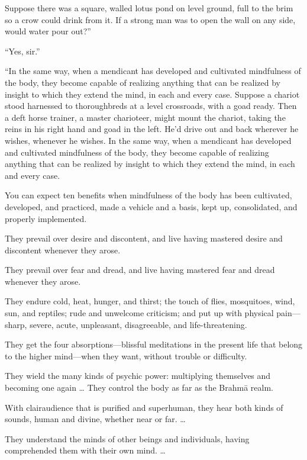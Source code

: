 \documentclass[12pt,openany]{book}%
\begin{document}
Suppose there was a square, walled lotus pond on level ground, full to the brim so a crow could drink from it. If a strong man was to open the wall on any side, would water pour out?” 

“Yes, sir.” 

“In the same way, when a mendicant has developed and cultivated mindfulness of the body, they become capable of realizing anything that can be realized by insight to which they extend the mind, in each and every case. Suppose a chariot stood harnessed to thoroughbreds at a level crossroads, with a goad ready. Then a deft horse trainer, a master charioteer, might mount the chariot, taking the reins in his right hand and goad in the left. He’d drive out and back wherever he wishes, whenever he wishes. In the same way, when a mendicant has developed and cultivated mindfulness of the body, they become capable of realizing anything that can be realized by insight to which they extend the mind, in each and every case. 

You can expect ten benefits when mindfulness of the body has been cultivated, developed, and practiced, made a vehicle and a basis, kept up, consolidated, and properly implemented. 

They prevail over desire and discontent, and live having mastered desire and discontent whenever they arose. 

They prevail over fear and dread, and live having mastered fear and dread whenever they arose. 

They endure cold, heat, hunger, and thirst; the touch of flies, mosquitoes, wind, sun, and reptiles; rude and unwelcome criticism; and put up with physical pain—sharp, severe, acute, unpleasant, disagreeable, and life-threatening. 

They get the four absorptions—blissful meditations in the present life that belong to the higher mind—when they want, without trouble or difficulty. 

They wield the many kinds of psychic power: multiplying themselves and becoming one again … They control the body as far as the \textsanskrit{Brahmā} realm. 

With clairaudience that is purified and superhuman, they hear both kinds of sounds, human and divine, whether near or far. … 

They understand the minds of other beings and individuals, having comprehended them with their own mind. … 
\end{document}
